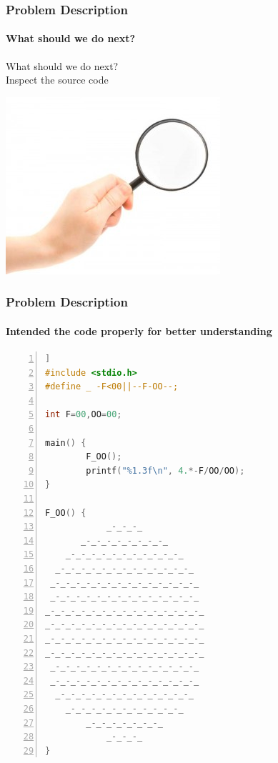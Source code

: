 \documentclass[12pt]{beamer}
\begin{document}
\begin{frame}
	\frametitle{Problem Description}
	\framesubtitle{What should we do next?}
	\begin{center}
		\small {What should we do next?} \\
		\large Inspect the source code
	\end{center}
	\includegraphics[scale=.4]{images/environmentalchimney-inspect-the-chimney-300x248.jpg} 
\end{frame}

\begin{frame}[fragile]
	\frametitle{Problem Description}
	\framesubtitle{Intended the code properly for better understanding}
	\begin{lstlisting}[language=C, breaklines=true, commentstyle=\color{mygreen}, rulecolor=\color{black}, numbers=left,  numbersep=2pt, numberstyle=\tiny\color{mygray}] ]
#include <stdio.h>
#define _ -F<00||--F-OO--;

int F=00,OO=00;

main() {
        F_OO();
        printf("%1.3f\n", 4.*-F/OO/OO);
}

F_OO() {
            _-_-_-_
       _-_-_-_-_-_-_-_-_
    _-_-_-_-_-_-_-_-_-_-_-_
  _-_-_-_-_-_-_-_-_-_-_-_-_-_
 _-_-_-_-_-_-_-_-_-_-_-_-_-_-_
 _-_-_-_-_-_-_-_-_-_-_-_-_-_-_
_-_-_-_-_-_-_-_-_-_-_-_-_-_-_-_
_-_-_-_-_-_-_-_-_-_-_-_-_-_-_-_
_-_-_-_-_-_-_-_-_-_-_-_-_-_-_-_
_-_-_-_-_-_-_-_-_-_-_-_-_-_-_-_
 _-_-_-_-_-_-_-_-_-_-_-_-_-_-_
 _-_-_-_-_-_-_-_-_-_-_-_-_-_-_
  _-_-_-_-_-_-_-_-_-_-_-_-_-_
    _-_-_-_-_-_-_-_-_-_-_-_
        _-_-_-_-_-_-_-_
            _-_-_-_
}
	\end{lstlisting}

\end{frame}
\end{document}
